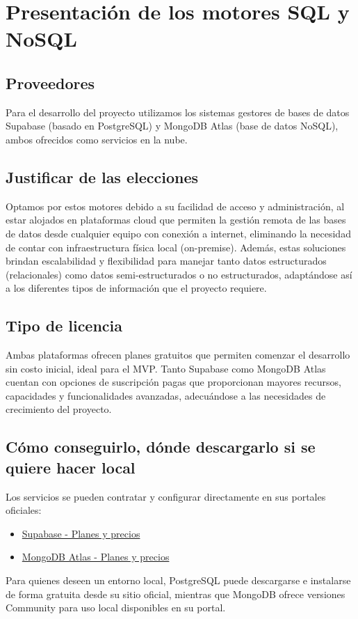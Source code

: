 
\section{Presentación de los motores SQL y NoSQL}
\subsection{Proveedores}
Para el desarrollo del proyecto utilizamos los sistemas gestores de bases de datos Supabase (basado en PostgreSQL) y MongoDB Atlas (base de datos NoSQL), ambos ofrecidos como servicios en la nube.
\subsection{Justificar de las elecciones}
Optamos por estos motores debido a su facilidad de acceso y administración, al estar alojados en plataformas cloud que permiten la gestión remota de las bases de datos desde cualquier equipo con conexión a internet, eliminando la necesidad de contar con infraestructura física local (on-premise). Además, estas soluciones brindan escalabilidad y flexibilidad para manejar tanto datos estructurados (relacionales) como datos semi-estructurados o no estructurados, adaptándose así a los diferentes tipos de información que el proyecto requiere.
\subsection{Tipo de licencia}
Ambas plataformas ofrecen planes gratuitos que permiten comenzar el desarrollo sin costo inicial, ideal para el MVP. Tanto Supabase como MongoDB Atlas cuentan con opciones de suscripción pagas que proporcionan mayores recursos, capacidades y funcionalidades avanzadas, adecuándose a las necesidades de crecimiento del proyecto.
\subsection{Cómo conseguirlo, dónde descargarlo si se quiere hacer local}
Los servicios se pueden contratar y configurar directamente en sus portales oficiales:
\begin{itemize}
    \item \href{https://supabase.com/pricing}{Supabase - Planes y precios}
    \item \href{https://www.mongodb.com/pricing}{MongoDB Atlas - Planes y precios}
\end{itemize}
Para quienes deseen un entorno local, PostgreSQL puede descargarse e instalarse de forma gratuita desde su sitio oficial, mientras que MongoDB ofrece versiones Community para uso local disponibles en su portal.
